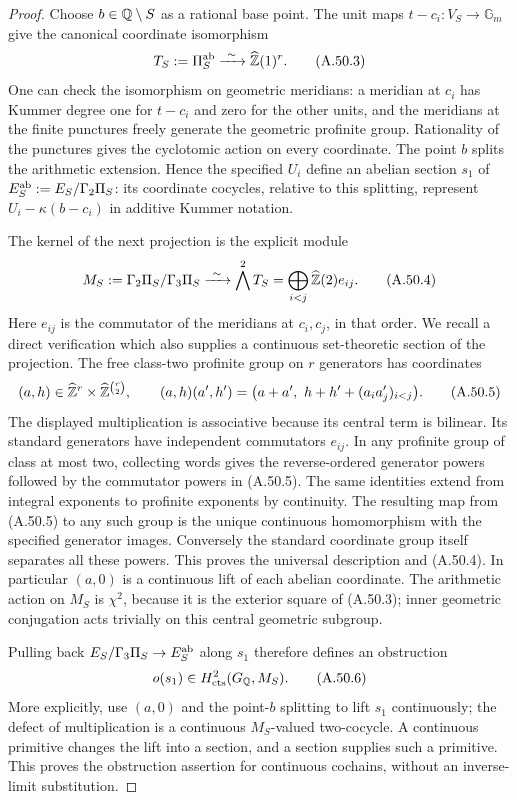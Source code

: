 \begin{proof}
Choose $b\in\mathbb Q\setminus S$ as a rational base point.  The unit
maps $t-c_i:V_S\to\mathbb G_m$ give the canonical coordinate
isomorphism
\[
 T_S:=\Pi_S^{\rm ab}\xrightarrow{\ \sim\ }
                      \widehat{\mathbb Z}(1)^r.
\tag{A.50.3}
\]
One can check the isomorphism on geometric meridians: a meridian
at $c_i$ has Kummer degree one for $t-c_i$ and zero for the
other units, and the meridians at the finite punctures freely
generate the geometric profinite group.  Rationality of the
punctures gives the cyclotomic action on every coordinate.
The point $b$ splits the arithmetic extension.  Hence the
specified $U_i$ define an abelian section $s_1$ of
$E_S^{\rm ab}:=E_S/\Gamma_2\Pi_S$: its coordinate cocycles,
relative to this splitting, represent
$U_i-\kappa(b-c_i)$ in additive Kummer notation.

The kernel of the next projection is the explicit module
\[
 M_S:=\Gamma_2\Pi_S/\Gamma_3\Pi_S
    \xrightarrow{\ \sim\ }\bigwedge^2 T_S
    =\bigoplus_{i<j}\widehat{\mathbb Z}(2)e_{ij}.
\tag{A.50.4}
\]
Here $e_{ij}$ is the commutator of the meridians at $c_i,c_j$,
in that order.  We recall a direct verification which also
supplies a continuous set-theoretic section of the projection.
The free class-two profinite group on $r$ generators has
coordinates
\[
 (a,h)\in\widehat{\mathbb Z}^r\times\widehat{\mathbb Z}^{\binom r2},\qquad
 (a,h)(a',h')=
  \bigl(a+a',\ h+h'+(a_i a'_j)_{i<j}\bigr).
\tag{A.50.5}
\]
The displayed multiplication is associative because its central
term is bilinear.  Its standard generators have independent
commutators $e_{ij}$.  In any profinite group of class at most
two, collecting words gives the reverse-ordered generator
powers followed by the commutator powers in (A.50.5).
The same identities extend from integral exponents to
profinite exponents by continuity.  The resulting map from
(A.50.5) to any such group is the unique continuous homomorphism
with the specified generator images.  Conversely the standard
coordinate group itself separates all these powers.
This proves the universal description and (A.50.4).
In particular $(a,0)$ is a continuous lift of each abelian
coordinate.  The arithmetic action on $M_S$ is $\chi^2$,
because it is the exterior square of (A.50.3); inner geometric
conjugation acts trivially on this central geometric subgroup.

Pulling back $E_S/\Gamma_3\Pi_S\to E_S^{\rm ab}$ along $s_1$
therefore defines an obstruction
\[
            o(s_1)\in H^2_{\rm cts}(G_\mathbb Q,M_S).
\tag{A.50.6}
\]
More explicitly, use $(a,0)$ and the point-$b$ splitting to
lift $s_1$ continuously; the defect of multiplication is a
continuous $M_S$-valued two-cocycle.  A continuous primitive
changes the lift into a section, and a section supplies such
a primitive.  This proves the obstruction assertion for
continuous cochains, without an inverse-limit substitution.


\end{proof}
